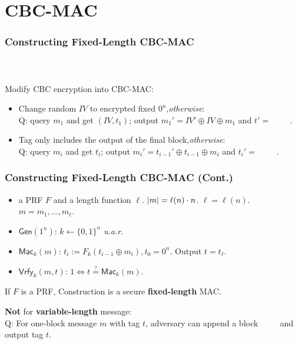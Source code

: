 \section{CBC-MAC}
\begin{frame}\frametitle{Constructing Fixed-Length CBC-MAC}
\begin{columns}[c]
\begin{figure}
\begin{center}

\end{center}
\end{figure}
\begin{figure}
\begin{center}

\end{center}
\end{figure}
\end{columns}
Modify CBC encryption into CBC-MAC:
\begin{itemize}
\item Change random $IV$ to encrypted fixed $0^{n}$,\emph{otherwise}:\\
\alert{Q: query $m_1$ and get $(IV, t_1)$; output $m_1' = IV' \oplus  IV \oplus m_{1}$ and $t' =$ \underline{$\qquad $}.} %
\item Tag only includes the output of the final block,\emph{otherwise}:\\
\alert{Q: query $m_i$ and get $t_i$; output $m_i' = t_{i-1}' \oplus t_{i-1} \oplus m_{i}$ and $t_{i}' = $ \underline{$\qquad$}.}%
\end{itemize}
\end{frame}
\begin{frame}\frametitle{Constructing Fixed-Length CBC-MAC (Cont.)}
\begin{construction}
\begin{itemize}
\item a PRF $F$ and a length function $\ell$. $\lvert m\rvert = \ell(n)\cdot n$.
$\ell=\ell(n)$. $m = m_1,\dotsc,m_{\ell}$.
\item $\mathsf{Gen}(1^n)$: $k \gets \{0,1\}^n$ \emph{u.a.r}.
\item $\mathsf{Mac}_k(m)$: $t_i := F_k(t_{i-1}\oplus m_i), t_0=0^n$. Output $t = t_\ell$.
\item $\mathsf{Vrfy}_k(m,t)$: $1 \iff t \overset{?}{=} \mathsf{Mac}_k(m)$.
\end{itemize}
\end{construction}
\begin{theorem}
If $F$ is a PRF, Construction is a secure \textbf{fixed-length} MAC.
\end{theorem}
\textbf{Not} for \textbf{variable-length} message:\\
\alert{Q: For one-block message $m$ with tag $t$, adversary can append a block \underline{$\qquad$} and output tag $t$.} %
\end{frame}
